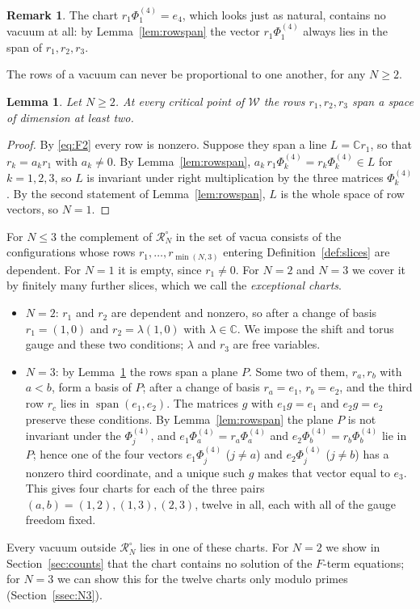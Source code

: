 \documentclass[11pt]{amsart}
\newtheorem{lemma}[theorem]{Lemma}
\theoremstyle{definition}
\newtheorem{remark}[theorem]{Remark}
\newcommand{\CC}{\mathbb{C}}
\newcommand{\cR}{\mathcal R}
\newcommand{\cW}{\mathcal W}
\begin{document}
\begin{remark}
The chart $r_1\Phi^{(4)}_1=e_4$, which looks just as natural, contains no vacuum at all: by Lemma~\ref{lem:rowspan} the vector $r_1\Phi^{(4)}_1$ always lies in the span of $r_1,r_2,r_3$.
\end{remark}

The rows of a vacuum can never be proportional to one another, for any $N\ge2$.

\begin{lemma}\label{lem:notproportional}
Let $N\ge2$. At every critical point of $\cW$ the rows $r_1,r_2,r_3$ span a space of dimension at least two.
\end{lemma}

\begin{proof}
By \eqref{eq:F2} every row is nonzero. Suppose they span a line $L=\CC r_1$, so that $r_k=a_kr_1$ with $a_k\ne0$. By Lemma~\ref{lem:rowspan}, $a_k\,r_1\Phi^{(4)}_k=r_k\Phi^{(4)}_k\in L$ for $k=1,2,3$, so $L$ is invariant under right multiplication by the three matrices $\Phi^{(4)}_k$. By the second statement of Lemma~\ref{lem:rowspan}, $L$ is the whole space of row vectors, so $N=1$.
\end{proof}

For $N\le3$ the complement of $\cR^\circ_N$ in the set of vacua consists of the configurations whose rows $r_1,\dots,r_{\min(N,3)}$ entering Definition~\ref{def:slices} are dependent. For $N=1$ it is empty, since $r_1\ne0$. For $N=2$ and $N=3$ we cover it by finitely many further slices, which we call the \emph{exceptional charts}.
\begin{itemize}
\item $N=2$: $r_1$ and $r_2$ are dependent and nonzero, so after a change of basis $r_1=(1,0)$ and $r_2=\lambda(1,0)$ with $\lambda\in\CC$. We impose the shift and torus gauge and these two conditions; $\lambda$ and $r_3$ are free variables.
\item $N=3$: by Lemma~\ref{lem:notproportional} the rows span a plane $P$. Some two of them, $r_a,r_b$ with $a<b$, form a basis of $P$; after a change of basis $r_a=e_1$, $r_b=e_2$, and the third row $r_c$ lies in $\operatorname{span}(e_1,e_2)$. The matrices $g$ with $e_1g=e_1$ and $e_2g=e_2$ preserve these conditions. By Lemma~\ref{lem:rowspan} the plane $P$ is not invariant under the $\Phi^{(4)}_j$, and $e_1\Phi^{(4)}_a=r_a\Phi^{(4)}_a$ and $e_2\Phi^{(4)}_b=r_b\Phi^{(4)}_b$ lie in $P$; hence one of the four vectors $e_1\Phi^{(4)}_j$ ($j\ne a$) and $e_2\Phi^{(4)}_j$ ($j\ne b$) has a nonzero third coordinate, and a unique such $g$ makes that vector equal to $e_3$. This gives four charts for each of the three pairs $(a,b)=(1,2),(1,3),(2,3)$, twelve in all, each with all of the gauge freedom fixed.
\end{itemize}
Every vacuum outside $\cR^\circ_N$ lies in one of these charts. For $N=2$ we show in Section~\ref{sec:counts} that the chart contains no solution of the $F$-term equations; for $N=3$ we can show this for the twelve charts only modulo primes (Section~\ref{ssec:N3}).
\end{document}
